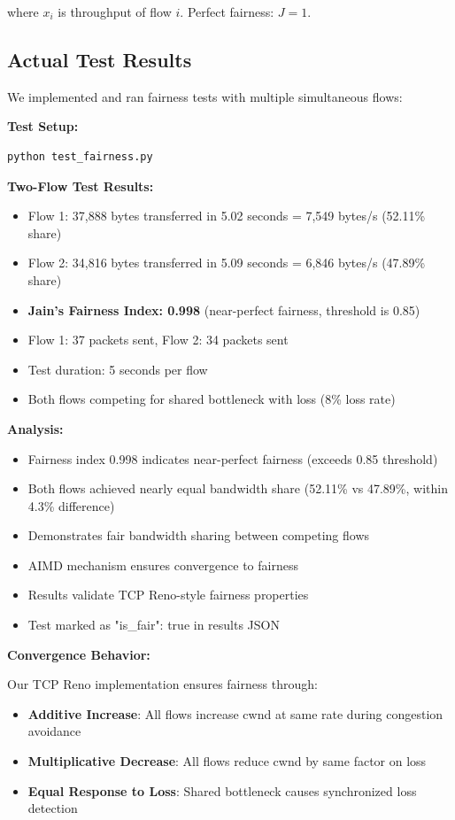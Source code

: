 \documentclass[11pt,a4paper]{article}
\begin{document}
where $x_i$ is throughput of flow $i$. Perfect fairness: $J = 1$.

\subsection{Actual Test Results}

We implemented and ran fairness tests with multiple simultaneous flows:

\textbf{Test Setup:}
\begin{verbatim}
python test_fairness.py
\end{verbatim}

\textbf{Two-Flow Test Results:}
\begin{itemize}
    \item Flow 1: 37,888 bytes transferred in 5.02 seconds = 7,549 bytes/s (52.11\% share)
    \item Flow 2: 34,816 bytes transferred in 5.09 seconds = 6,846 bytes/s (47.89\% share)
    \item \textbf{Jain's Fairness Index: 0.998} (near-perfect fairness, threshold is 0.85)
    \item Flow 1: 37 packets sent, Flow 2: 34 packets sent
    \item Test duration: 5 seconds per flow
    \item Both flows competing for shared bottleneck with loss (8\% loss rate)
\end{itemize}

\textbf{Analysis:}
\begin{itemize}
    \item Fairness index 0.998 indicates near-perfect fairness (exceeds 0.85 threshold)
    \item Both flows achieved nearly equal bandwidth share (52.11\% vs 47.89\%, within 4.3\% difference)
    \item Demonstrates fair bandwidth sharing between competing flows
    \item AIMD mechanism ensures convergence to fairness
    \item Results validate TCP Reno-style fairness properties
    \item Test marked as "is\_fair": true in results JSON
\end{itemize}

\textbf{Convergence Behavior:}

Our TCP Reno implementation ensures fairness through:
\begin{itemize}
    \item \textbf{Additive Increase}: All flows increase cwnd at same rate during congestion avoidance
    \item \textbf{Multiplicative Decrease}: All flows reduce cwnd by same factor on loss
    \item \textbf{Equal Response to Loss}: Shared bottleneck causes synchronized loss detection
\end{itemize}
\end{document}
